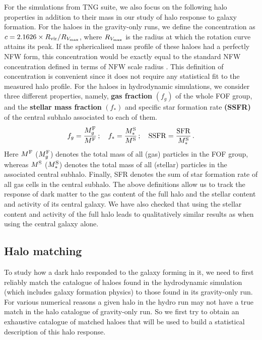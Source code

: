 For the simulations from TNG suite, we also focus on the following halo properties in addition to their mass in our study of halo response to galaxy formation. 
For the haloes in the gravity-only runs, we define the concentration as $c=2.1626 \times R_{\rm vir}/R_{V_{\rm{max}}}$, where $R_{V_{\rm{max}}}$ is the radius at which the rotation curve attains its peak. If the sphericalised mass profile of these haloes had a perfectly NFW form, this concentration would be exactly equal to the standard NFW concentration defined in terms of NFW scale radius \citep[see equation 5 of ][]{1996ApJ...462..563N}. 
This definition of concentration is convenient since it does not require any statistical fit to the measured halo profile.
For the haloes in hydrodynamic simulations, we consider 
three different properties, namely, \textbf{gas fraction} $(f_g)$ of the whole FOF group, and the \textbf{stellar mass fraction} $(f_{\ast})$ and specific star formation rate \textbf{(SSFR)} of the central subhalo associated to each of them. 
\begin{align}
    f_{g} = \frac{M_{g}^{\rm{F}}}{M^{\rm{F}}}\,; \quad
    f_{\ast} = \frac{M_{\ast}^{\rm{S}}}{M^{\rm{S}}}\,; \quad {\rm SSFR} = \frac{\rm{SFR}}{M_{\ast}^{\rm{S}}}\,.
\label{eq:galpropdefs-ch:z0main}
\end{align}
Here $M^{\rm{F}}$ ($M_{g}^{\rm{F}}$) denotes the total mass of all (gas) particles in the FOF group, whereas $M^{\rm{S}}$ ($M_{\ast}^{\rm{S}}$) denotes the total mass of all (stellar) particles in the associated central subhalo. 
Finally, SFR denotes the sum of star formation rate of all gas cells in the central subhalo. The above definitions allow us to track the response of dark matter to the gas content of the full halo and the stellar content and activity of its central galaxy. We have also checked that using the stellar content and activity of the full halo leads to qualitatively similar results as when using the central galaxy alone.


\subsection{Halo matching}
\label{sec:methods-match-ch:z0main}
To study how a dark halo responded to the galaxy forming in it, we need to first reliably match the catalogue of haloes found in the hydrodynamic simulation (which includes galaxy formation physics) to those found in its gravity-only run. For various numerical reasons a given halo in the hydro run may not have a true match in the halo catalogue of gravity-only run. So we first try to obtain an exhaustive catalogue of matched haloes that will be used to build a statistical description of this halo response.


